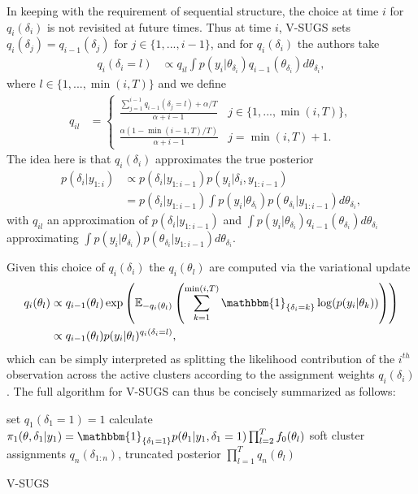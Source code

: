 \documentclass{uwstat572}
\begin{document}
In keeping with the requirement of sequential structure, the choice at time $i$ for $q_i(\delta_i)$ is not revisited at future times. Thus at time $i$, V-SUGS sets $q_i(\delta_j) = q_{i-1}(\delta_j)$ for $j \in \{1,...,i-1\}$, and for $q_i(\delta_i)$ the authors take
\begin{align} q_i(\delta_i = l) &\propto q_{il} \int p(y_i | \theta_{\delta_i}) q_{i-1}(\theta_{\delta_i}) d\theta_{\delta_i}, \label{eq:softassign} \end{align}
where $l \in \{1,..., \min(i,T)\}$ and we define
\begin{align} q_{il} &= \begin{cases} 
      \frac{\sum_{j=1}^{i-1} q_{i-1}(\delta_j = l)+\alpha/T}{\alpha+i-1}& j \in \{1,...,\min(i,T)\}, \\
      \frac{\alpha(1-\min(i-1,T)/T)}{\alpha+i-1} & j = \min(i,T) +1.
   \end{cases}
\label{eq:TDPprior} \end{align}
The idea here is that $q_i(\delta_i)$ approximates the true posterior
\begin{align}
p(\delta_i | y_{1:i}) &\propto p(\delta_i | y_{1:i-1})p(y_i | \delta_i,y_{1:i-1}) \nonumber \\
&= p(\delta_i | y_{1:i-1}) \int p(y_i | \theta_{\delta_i}) p(\theta_{\delta_i}|y_{1:i-1}) d\theta_{\delta_i}, \nonumber
\end{align}
with $q_{il}$ an approximation of $p(\delta_i | y_{1:i-1})$ and $ \int p(y_i | \theta_{\delta_i}) q_{i-1}(\theta_{\delta_i}) d\theta_{\delta_i}$ approximating $\int p(y_i | \theta_{\delta_i}) p(\theta_{\delta_i}|y_{1:i-1}) d\theta_{\delta_i}$. 

Given this choice of $q_i(\delta_i)$ the $q_i(\theta_l)$ are computed via the variational update
\begin{align}
q_i(\theta_l) &\propto q_{i-1}(\theta_l) \exp \left( \mathbb{E}_{-q_i(\theta_l)} \left( \sum_{k=1}^{\min(i,T)} \mathbbm{1}_{\{\delta_i = k\}} \log(p(y_i | \theta_k))\right)\right) \nonumber \\
&\propto q_{i-1}(\theta_l)p(y_i | \theta_l)^{q_i(\delta_i=l)}, \label{eq:varupdate}
\end{align}
which can be simply interpreted as splitting the likelihood contribution of the $i^{th}$ observation across the active clusters according to the assignment weights $q_i(\delta_i)$. The full algorithm for V-SUGS can thus be concisely summarized as follows:
\medskip

\begin{algorithm}[H]
 set $q_1(\delta_1 = 1) = 1$ \;
 calculate $\pi_1(\theta,\delta_1 | y_1) =  \mathbbm{1}_{\{\delta_1 = 1\}} p(\theta_1 | y_1,\delta_1 = 1)\prod_{l=2}^T f_0(\theta_l)$ \;
 \Return soft cluster assignments $q_n(\delta_{1:n})$, truncated posterior $\prod_{l=1}^{T} q_n(\theta_l)$
 \caption{V-SUGS}
\end{algorithm}
\medskip
\end{document}

